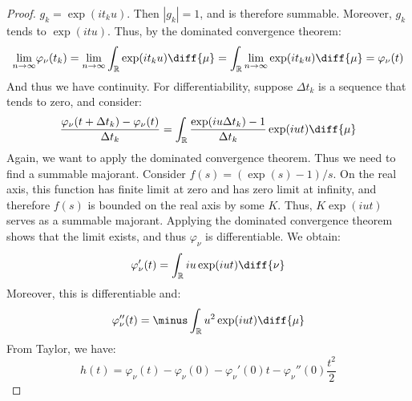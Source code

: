 \begin{proof}
            $g_{k}=\exp(it_{k}u)$. Then $|g_{k}|=1$, and is
            therefore summable. Moreover, $g_{k}$ tends to
            $\exp(itu)$. Thus, by the dominated convergence
            theorem:
            \begin{equation}
                \underset{n\rightarrow\infty}{\lim}
                \varphi_{\nu}(t_{k})
                =\underset{n\rightarrow\infty}{\lim}
                \int_{\mathbb{R}}\exp(it_{k}u)\diff{\mu}
                =\int_{\mathbb{R}}
                    \underset{n\rightarrow\infty}{\lim}
                    \exp(it_{k}u)\diff{\mu}
                =\varphi_{\nu}(t)
            \end{equation}
            And thus we have continuity. For differentiability,
            suppose $\Delta{t}_{k}$ is a sequence that
            tends to zero, and consider:
            \begin{equation}
                \frac{\varphi_{\nu}(t+\Delta{t}_{k})-
                      \varphi_{\nu}(t)}{\Delta{t}_{k}}=
                \int_{\mathbb{R}}
                \frac{\exp(iu\Delta{t}_{k})-1}{\Delta{t}_{k}}
                \exp(iut)\diff{\mu}
            \end{equation}
            Again, we want to apply the dominated convergence
            theorem. Thus we need to find a summable
            majorant. Consider $f(s)=(\exp(s)-1)/s$. On the
            real axis, this function has finite limit at
            zero and has zero limit at infinity, and therefore
            $f(s)$ is bounded on the real axis by some $K$.
            Thus, $K\exp(iut)$ serves as a summable majorant.
            Applying the dominated convergence theorem shows
            that the limit exists, and thus
            $\varphi_{\nu}$ is differentiable. We obtain:
            \begin{equation}
                \varphi_{\nu}'(t)=
                \int_{\mathbb{R}}iu\exp(iut)\diff{\nu}
            \end{equation}
            Moreover, this is differentiable and:
            \begin{equation}
                \varphi_{\nu}''(t)=
                \minus\int_{\mathbb{R}}u^{2}\exp(iut)
                    \diff{\mu}
            \end{equation}
            From Taylor, we have:
            \begin{equation}
                h(t)=\varphi_{\nu}(t)-\varphi_{\nu}(0)
                    -\varphi_{\nu}'(0)t-\varphi_{\nu}''(0)
                        \frac{t^{2}}{2}

\end{equation}
\end{proof}
